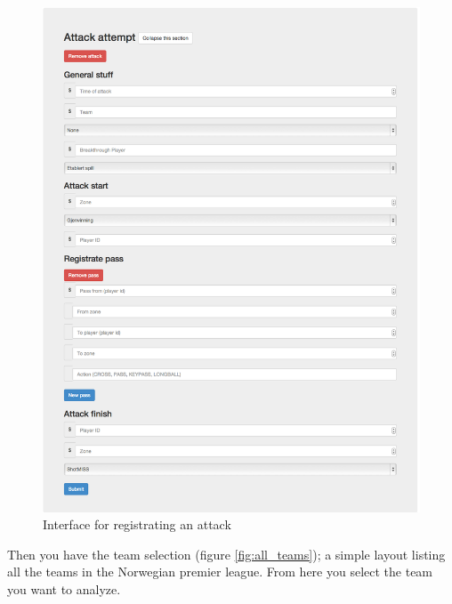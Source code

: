 \begin{figure}[ht!]
\centering
\includegraphics[width=1\textwidth]{images/general/reg_attack.png}
\caption{Interface for registrating an attack}
\label{fig:reg_attack}
\end{figure}

Then you have the team selection (figure \ref{fig:all_teams}); a simple layout listing all the teams in the Norwegian premier league. From here you select the team you want to analyze.


